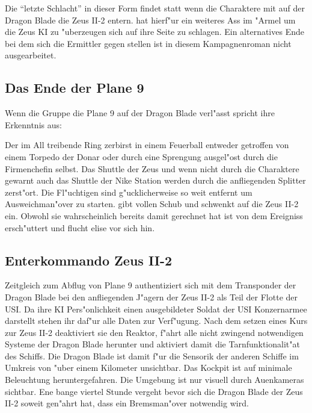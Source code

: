 
Die "`letzte Schlacht"' in dieser Form findet statt wenn die Charaktere mit \xl{} auf der Dragon Blade die Zeus II-2 entern. \xl{} hat hierf"ur ein weiteres Ass im "Armel um die Zeus KI zu "uberzeugen sich auf ihre Seite zu schlagen. Ein alternatives Ende bei dem sich die Ermittler gegen \xl{} stellen ist in diesem Kampagnenroman nicht ausgearbeitet.

\subsection{Das Ende der Plane 9}
Wenn die Gruppe die Plane 9 auf der Dragon Blade verl"asst spricht \xl{} ihre Erkenntnis aus:


Der im All treibende Ring zerbirst in einem Feuerball entweder getroffen von einem Torpedo der Donar oder durch eine Sprengung ausgel"ost durch die Firmenchefin selbst. Das Shuttle der Zeus und wenn nicht durch die Charaktere gewarnt auch das Shuttle der Nike Station werden durch die anfliegenden Splitter zerst"ort. Die Fl"uchtigen sind g"ucklicherweise so weit entfernt um Ausweichman"over zu starten. \xl{} gibt vollen Schub und schwenkt auf die Zeus II-2 ein. Obwohl sie wahrscheinlich bereits damit gerechnet hat ist \ml{} von dem Ereigniss ersch"uttert und flucht elise vor sich hin.

\subsection{Enterkommando Zeus II-2}
Zeitgleich zum Abflug von Plane 9 authentiziert sich \xl{} mit dem Transponder der Dragon Blade bei den anfliegenden J"agern der Zeus II-2 als Teil der Flotte der USI. Da ihre KI Pers"onlichkeit einen ausgebildeter Soldat der USI Konzernarmee darstellt stehen ihr daf"ur alle Daten zur Verf"ugung. Nach dem setzen eines Kurs zur Zeus II-2 deaktiviert sie den Reaktor, f"ahrt alle nicht zwingend notwendigen Systeme der Dragon Blade herunter und aktiviert damit die Tarnfunktionalit"at des Schiffs. Die Dragon Blade ist damit f"ur die Sensorik der anderen Schiffe im Umkreis von "uber einem Kilometer unsichtbar. Das Kockpit ist auf minimale Beleuchtung heruntergefahren. Die Umgebung ist nur visuell durch Au\3enkameras sichtbar. Ene bange viertel Stunde vergeht bevor sich die Dragon Blade der Zeus II-2 soweit gen"ahrt hat, dass ein Bremsman"over notwendig wird.

